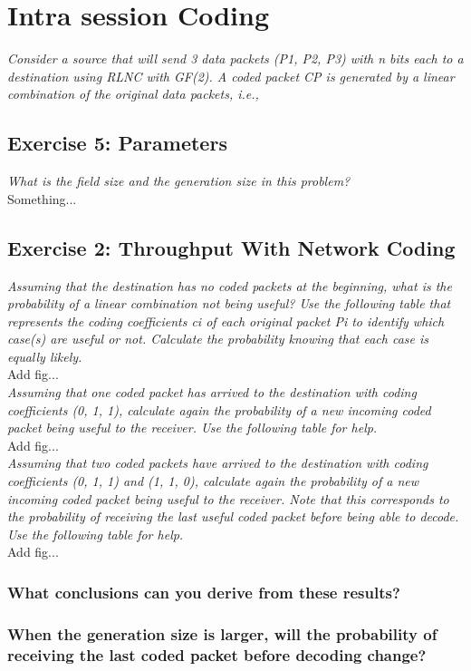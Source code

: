 \section{Intra session Coding}
\textit{Consider a source that will send 3 data packets (P1, P2, P3) with n bits each to a destination using RLNC with GF(2). A coded packet CP is generated by a linear combination of the original data packets, i.e.,}

\subsection{Exercise 5: Parameters }
\textit{What is the field size and the generation size in this problem?}\\

Something...

\subsection{Exercise 2: Throughput With Network Coding}
\textit{Assuming that the destination has no coded packets at the beginning, what is the probability of a linear combination not being useful? Use the following table that represents the coding coefficients ci of each original packet Pi to identify which case(s) are useful or not. Calculate the probability knowing that each case is equally likely.}\\

Add fig...\\

\textit{Assuming that one coded packet has arrived to the destination with coding coefficients (0, 1, 1), calculate again the probability of a new incoming coded packet being useful to the receiver. Use the following table for help.}\\

Add fig...\\

\textit{Assuming that two coded packets have arrived to the destination with coding coefficients (0, 1, 1) and (1, 1, 0), calculate again the probability of a new incoming coded packet being useful to the receiver. Note that this corresponds to the probability of receiving the last useful coded packet before being able to decode. Use the following table for help.}\\

Add fig...\\

\subsubsection{What conclusions can you derive from these results?}

\subsubsection{When the generation size is larger, will the probability of receiving the last coded packet before decoding change?}

